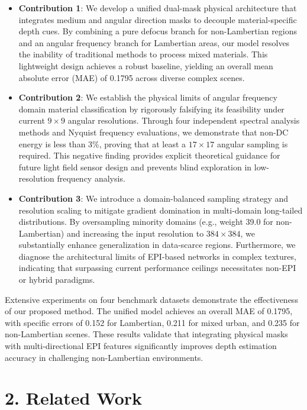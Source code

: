 \documentclass[lettersize,journal]{IEEEtran}
\begin{document}
\begin{itemize}
  \item \textbf{Contribution 1}: We develop a unified dual-mask physical architecture that integrates medium and angular direction masks to decouple material-specific depth cues. By combining a pure defocus branch for non-Lambertian regions and an angular frequency branch for Lambertian areas, our model resolves the inability of traditional methods to process mixed materials. This lightweight design achieves a robust baseline, yielding an overall mean absolute error (MAE) of 0.1795 across diverse complex scenes.
  \item \textbf{Contribution 2}: We establish the physical limits of angular frequency domain material classification by rigorously falsifying its feasibility under current $9 \times 9$ angular resolutions. Through four independent spectral analysis methods and Nyquist frequency evaluations, we demonstrate that non-DC energy is less than 3\%, proving that at least a $17 \times 17$ angular sampling is required. This negative finding provides explicit theoretical guidance for future light field sensor design and prevents blind exploration in low-resolution frequency analysis.
  \item \textbf{Contribution 3}: We introduce a domain-balanced sampling strategy and resolution scaling to mitigate gradient domination in multi-domain long-tailed distributions. By oversampling minority domains (e.g., weight 39.0 for non-Lambertian) and increasing the input resolution to $384 \times 384$, we substantially enhance generalization in data-scarce regions. Furthermore, we diagnose the architectural limits of EPI-based networks in complex textures, indicating that surpassing current performance ceilings necessitates non-EPI or hybrid paradigms.
\end{itemize}
Extensive experiments on four benchmark datasets demonstrate the effectiveness of our proposed method. The unified model achieves an overall MAE of 0.1795, with specific errors of 0.152 for Lambertian, 0.211 for mixed urban, and 0.235 for non-Lambertian scenes. These results validate that integrating physical masks with multi-directional EPI features significantly improves depth estimation accuracy in challenging non-Lambertian environments.

\section{2. Related Work}
\end{document}
